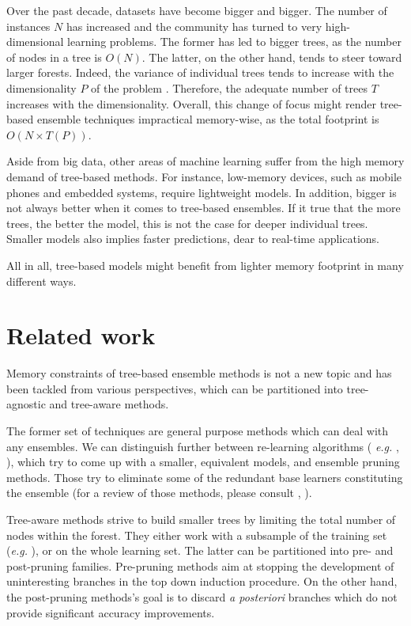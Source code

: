 \documentclass{article}
\begin{document}
Over the past decade, datasets have become bigger and bigger. The number of 
instances $N$ has increased and the community has turned to very 
high-dimensional learning problems. The former has led to bigger trees, as the 
number of nodes in a tree is $O(N)$. The latter, on the other hand, tends to 
steer toward larger forests. Indeed, the variance of individual trees tends to 
increase with the dimensionality $P$ of the problem \cite{l1basedcomp}. 
Therefore, the adequate number of trees $T$ increases with the dimensionality. 
Overall, this change of focus might render tree-based ensemble techniques 
impractical memory-wise, as the total footprint is $O(N \times T(P))$. 

Aside from big data, other areas of machine learning suffer from the high 
memory demand of tree-based methods. For instance, low-memory devices, such as 
mobile phones and embedded systems, require lightweight models. In addition, 
bigger is not always better when it comes to tree-based ensembles.
If it true that the more trees, the better the model, this is not the case for 
deeper individual trees.
Smaller models also implies faster predictions, dear to real-time applications.

All in all, tree-based models might benefit from lighter memory footprint in 
many different ways.


\section{Related work}
\label{sec:relatedWork}
Memory constraints of tree-based ensemble methods is not a new topic and has 
been tackled from various perspectives, which can be partitioned into 
tree-agnostic and tree-aware methods.

The former set of techniques are general purpose methods which can deal with  
any ensembles. We can distinguish further between re-learning algorithms ({\it 
e.g.} \citet{domingos1997oracle}, \citet{menke2009oracle}), which try to come 
up with a smaller, equivalent models, and ensemble pruning methods. Those try 
to eliminate some of the redundant base learners constituting the ensemble (for 
a review of those methods, please consult \citet{tsoumakas2008enspruning}, 
\citet{rokach2016enspruning}). 

Tree-aware methods strive to build smaller trees by limiting the total number 
of nodes within the forest. They either work with a subsample of the training 
set ({\it e.g.} \citet{breiman1999pasting}), or on the whole learning set. The 
latter can be partitioned into pre- and post-pruning families. 
Pre-pruning methods aim at stopping the development of uninteresting branches 
in the top down induction procedure. On the other hand, the post-pruning 
methods's goal is to discard {\it a posteriori} branches which do not provide 
significant accuracy improvements.
\end{document}
